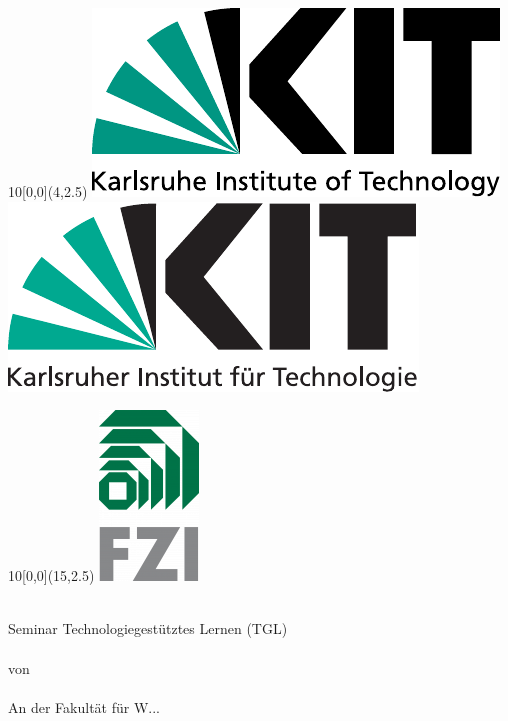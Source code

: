 
\newcommand{\diameter}{20}
\newcommand{\xone}{-15}
\newcommand{\xtwo}{160}
\newcommand{\yone}{15}
\newcommand{\ytwo}{-253}

\begin{titlepage}
	\begin{textblock}{10}[0,0](4,2.5)
			{\includegraphics[width=.3\textwidth]{logos/KITLogo_EN_RGB.pdf}}
			{\includegraphics[width=.3\textwidth]{logos/KITLogo_DE_RGB.pdf}}		
	\end{textblock}
	\begin{textblock}{10}[0,0](15,2.5)
		\includegraphics[width=.1\textwidth]{logos/FZI_Logo.png}
	\end{textblock}
	\vspace*{3.5cm}
	\begin{center}
		\Huge{\mytitle}
		\vspace*{2cm}\\
		\Large{
			Seminar Technologiegestütztes Lernen (TGL) \\
								{\mytype\\von}
		}\\
		\vspace*{1cm}
		\huge{\myname}\\
		\vspace*{1cm}
		\Large{
							    {An der Fakult\"at f\"ur W...}
			\\
			\myinstitute
		}
	\end{center}
	\vspace*{3cm}

\end{titlepage}
